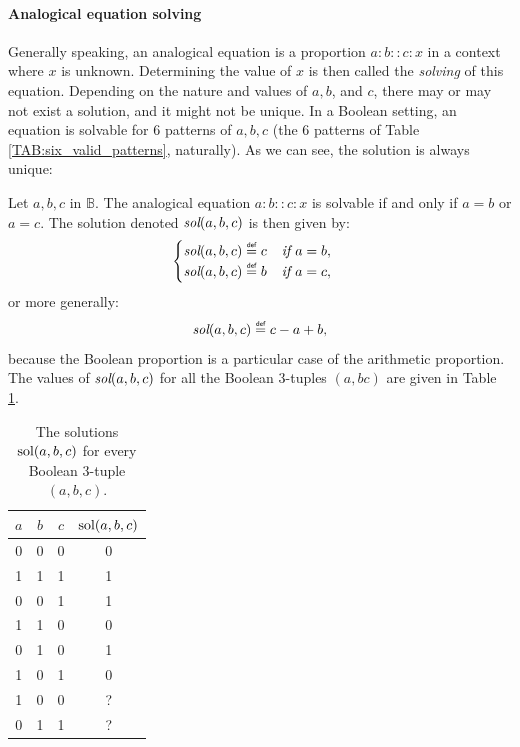 \paragraph{Analogical equation solving\\}

Generally speaking, an analogical equation is a proportion $a:b::c:x$ in a
context where $x$ is unknown. Determining the value of $x$ is then called the
\textit{solving} of this equation. Depending on the nature and values of $a, b$,
and $c$, there may or may not exist a solution, and it might not be unique. In a
Boolean setting, an equation is solvable for 6 patterns of $a, b, c$ (the 6
patterns of Table \ref{TAB:six_valid_patterns}, naturally). As we can see, the
solution is always unique:

\begin{proposition}
  \label{PROPOS:equation_solving}
  Let $a, b, c$ in $\mathbb{B}$. The analogical equation
  $a :b::c:x$
  is solvable if and only if $a = b$ or $a = c$. The solution denoted
  $\emph{sol}(a, b, c)$ is then given by:
  $$
  \begin{cases}
    \emph{sol}(a, b, c) \eqdef c \emph{~~ if } a = b,\\
    \emph{sol}(a, b, c) \eqdef b \emph{~~ if } a = c,
  \end{cases}
  $$
  or more generally:
  $$\emph{sol}(a, b, c) \eqdef c - a + b,$$
  because the Boolean proportion is a particular case of the arithmetic
  proportion. The values of $\emph{sol}(a, b, c)$ for all the Boolean $3$-tuples $(a,
  b c)$ are given in Table \ref{TAB:solutions}.
\end{proposition}

\begin{table}[t]
  \centering
  \begin{tabular}[t]{cccc}
    \toprule
    $a$ & $b$ & $c$ & $\text{sol}(a, b, c)$ \\
    \midrule
    0 & 0 & 0 & 0 \\
    1 & 1 & 1 & 1 \\
    0 & 0 & 1 & 1 \\
    1 & 1 & 0 & 0 \\
    0 & 1 & 0 & 1 \\
    1 & 0 & 1 & 0 \\
    1 & 0 & 0 &?\\
    0 & 1 & 1 &?\\
    \bottomrule
  \end{tabular}
  \caption{The solutions $\text{sol}(a, b, c)$ for every Boolean $3$-tuple $(a, b,
  c)$.}
  \label{TAB:solutions}
\end{table}

